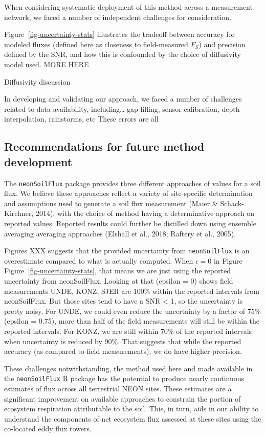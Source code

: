 \documentclass[
  letterpaper,
  DIV=11,
  numbers=noendperiod]{scrartcl}
\begin{document}
When considering systematic deployment of this method across a
measurement network, we faced a number of independent challenges for
consideration.

Figure~\ref{fig-uncertainty-stats} illustrates the tradeoff between
accuracy for modeled fluxes (defined here as closeness to field-measured
\(F_{S}\)) and precision defined by the SNR, and how this is confounded
by the choice of diffusivity model used. MORE HERE

Diffusivity discussion

In developing and validating our approach, we faced a number of
challenges related to data availability, including\ldots{} gap filling,
sensor calibration, depth interpolation, rainstorms, etc These errors
are all

\subsection{Recommendations for future method
development}\label{recommendations-for-future-method-development}

The \texttt{neonSoilFlux} package provides three different approaches of
values for a soil flux. We believe these approaches reflect a variety of
site-specific determination and assumptions used to generate a soil flux
measurement (Maier \& Schack-Kirchner, 2014), with the choice of method
having a determinative approach on reported values. Reported results
could further be distilled down using ensemble averaging averaging
approaches (Elshall et al., 2018; Raftery et al., 2005).

Figures XXX suggests that the provided uncertainty from
\texttt{neonSoilFlux} is an overestimate compared to what is actually
computed. When \(\epsilon=0\) in Figure
Figure~\ref{fig-uncertainty-stats}, that means we are just using the
reported uncertainty from neonSoilFlux. Looking at that (epsilon = 0)
shows field measurements UNDE, KONZ, SJER are 100\% within the reported
intervals from neonSoilFlux. But those sites tend to have a SNR
\textless{} 1, so the uncertainty is pretty noisy. For UNDE, we could
even reduce the uncertainty by a factor of 75\% (epsilon = 0.75), more
than half of the field measurements will still be within the reported
intervals. For KONZ, we are still within 70\% of the reported intervals
when uncertainty is reduced by 90\%. That suggests that while the
reported accuracy (as compared to field measurements), we do have higher
precision.

These challenges notwithstanding, the method used here and made
available in the \texttt{neonSoilFlux} R package has the potential to
produce nearly continuous estimates of flux across all terrestrial NEON
sites. These estimates are a significant improvement on available
approaches to constrain the portion of ecosystem respiration
attributable to the soil. This, in turn, aids in our ability to
understand the components of net ecosystem flux assessed at these sites
using the co-located eddy flux towers.
\end{document}
